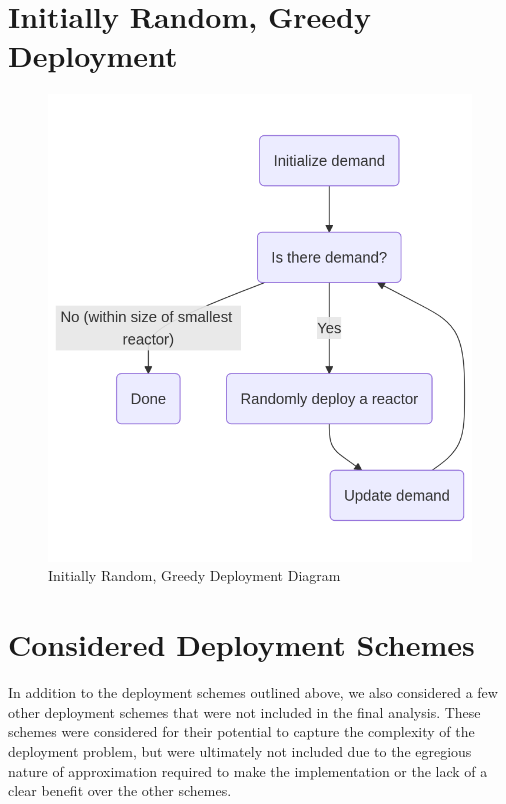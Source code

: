 

\section{Initially Random, Greedy Deployment}

\begin{figure}[!htbp]
    \centering
    \includegraphics[scale=0.4]{images/schemes/random_diagram.png}
    \caption{Initially Random, Greedy Deployment Diagram}
    \label{fig:init_random_greedy_diagram}
\end{figure}




\section{Considered Deployment Schemes}

In addition to the deployment schemes outlined above, we also considered a few other deployment schemes that were not included in the final analysis. These schemes were considered for their potential to capture the complexity of the deployment problem, but were ultimately not included due to the egregious nature of approximation required to make the implementation or the lack of a clear benefit over the other schemes.

